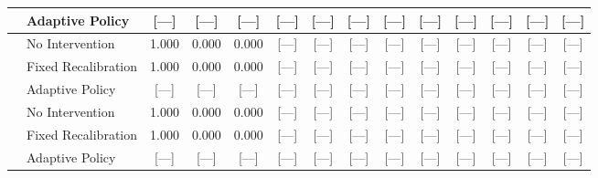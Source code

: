 \begin{table}[t]
\begin{tabular}{ll ccc cccc ccccc}
& Adaptive Policy     & [---] & [---] & [---] & [---] & [---] & [---] & [---] & [---] & [---] & [---] & [---] & [---] \\
\midrule
{} 
& No Intervention     & 1.000 & 0.000 & 0.000 & [---] & [---] & [---] & [---] & [---] & [---] & [---] & [---] & [---] \\
& Fixed Recalibration & 1.000 & 0.000 & 0.000 & [---] & [---] & [---] & [---] & [---] & [---] & [---] & [---] & [---] \\
& Adaptive Policy     & [---] & [---] & [---] & [---] & [---] & [---] & [---] & [---] & [---] & [---] & [---] & [---] \\
\midrule
{} 
& No Intervention     & 1.000 & 0.000 & 0.000 & [---] & [---] & [---] & [---] & [---] & [---] & [---] & [---] & [---] \\
& Fixed Recalibration & 1.000 & 0.000 & 0.000 & [---] & [---] & [---] & [---] & [---] & [---] & [---] & [---] & [---] \\
& Adaptive Policy     & [---] & [---] & [---] & [---] & [---] & [---] & [---] & [---] & [---] & [---] & [---] & [---] \\
\bottomrule
\end{tabular}
\end{table}
